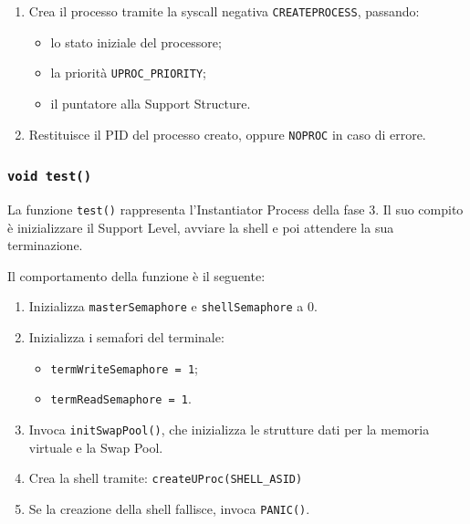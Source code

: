 \documentclass[a4paper,12pt]{article}
\begin{document}
\begin{enumerate}
\begin{enumerate}
    \texttt{initUProc(asid, \&procState, support)}

    \item Crea il processo tramite la syscall negativa \texttt{CREATEPROCESS}, passando:
    \begin{itemize}
        \item lo stato iniziale del processore;
        \item la priorità \texttt{UPROC\_PRIORITY};
        \item il puntatore alla Support Structure.
    \end{itemize}

    \item Restituisce il PID del processo creato, oppure \texttt{NOPROC} in caso di errore.
\end{enumerate}

\vspace{0.3cm}
\subsubsection{\texttt{void test()}}

La funzione \texttt{test()} rappresenta l'Instantiator Process della fase 3. Il suo compito è inizializzare il Support Level, avviare la shell e poi attendere la sua terminazione.

Il comportamento della funzione è il seguente:

\begin{enumerate}
    \item Inizializza \texttt{masterSemaphore} e \texttt{shellSemaphore} a 0.

    \item Inizializza i semafori del terminale:
    \begin{itemize}
        \item \texttt{termWriteSemaphore = 1};
        \item \texttt{termReadSemaphore = 1}.
    \end{itemize}

    \item Invoca \texttt{initSwapPool()}, che inizializza le strutture dati per la memoria virtuale e la Swap Pool.

    \item Crea la shell tramite: \texttt{createUProc(SHELL\_ASID)}


    \item Se la creazione della shell fallisce, invoca \texttt{PANIC()}.


\end{enumerate}
\end{enumerate}
\end{document}
